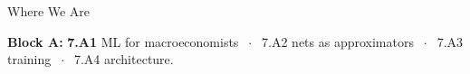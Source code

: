 

\graphicspath{{./figures/}}

\newcommand{\repo}[2]{\href{https://github.com/vonzhg/Macro-2026Fall/blob/main/#1}{\texttt{#2}}}




\makedecktitle

\begin{frame}{Where We Are}
\vspace{-1mm}
\begin{center}
\small \textbf{Block A:} \textbf{7.A1} ML for macroeconomists $\;\cdot\;$ 7.A2 nets as approximators $\;\cdot\;$ 7.A3 training $\;\cdot\;$ 7.A4 architecture.
\end{center}
\end{frame}

